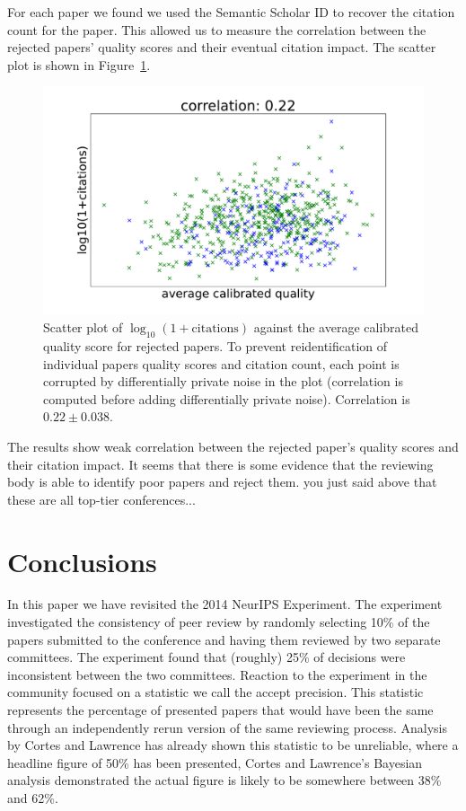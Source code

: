 \documentclass[twoside]{article}
\newcommand\cc[1]{{\color{red}#1}}
\begin{document}
For each paper we found we used the Semantic Scholar ID to recover the
citation count for the paper. This allowed us to measure the
correlation between the rejected papers' quality scores and their
eventual citation impact. The scatter plot is shown in Figure~\ref{figure-citations-vs-average-calibrated-quality-reject}.

\begin{figure}[htb]
\begin{center}
\includegraphics[width=0.90\columnwidth]{diagrams/neurips/citations-vs-average-calibrated-quality-reject.pdf}
\end{center}
\caption{Scatter plot of $\log_{10}(1+\text{citations})$ against the
  average calibrated quality score for rejected papers. To prevent
  reidentification of individual papers quality scores and citation
  count, each point is corrupted by differentially private noise in
  the plot (correlation is computed before adding differentially
  private noise). Correlation is $0.22 \pm 0.038$. }
\label{figure-citations-vs-average-calibrated-quality-reject}
\end{figure}

The results show weak correlation between the rejected paper's quality
scores and their citation impact. It seems that there is some evidence
that the reviewing body is able to identify poor papers and reject
them. \cc{you just said above that these are all top-tier conferences...}

\section{Conclusions}

In this paper we have revisited the 2014 NeurIPS Experiment. The
experiment investigated the consistency of peer review by randomly
selecting 10\% of the papers submitted to the conference and having
them reviewed by two separate committees. The experiment found that
(roughly) 25\% of decisions were inconsistent between the two
committees. Reaction to the experiment in the community focused on a
statistic we call the accept precision. This statistic represents the
percentage of presented papers that would have been the same through
an independently rerun version of the same reviewing process. Analysis
by Cortes and Lawrence has already shown this statistic to be
unreliable, where a headline figure of 50\% has been presented, Cortes
and Lawrence's Bayesian analysis demonstrated the actual figure is
likely to be somewhere between 38\% and 62\%.
\end{document}
